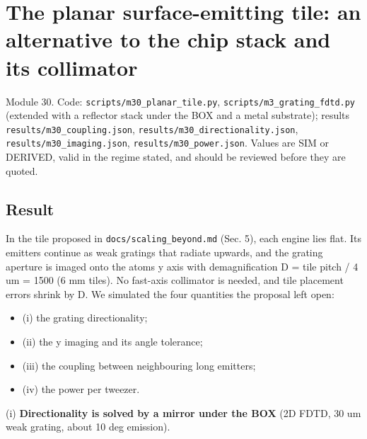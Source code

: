 \hypertarget{the-planar-surface-emitting-tile-an-alternative-to-the-chip-stack-and-its-collimator}{%
\chapter{The planar surface-emitting tile: an alternative to the chip
stack and its
collimator}\label{planar_tile-the-planar-surface-emitting-tile-an-alternative-to-the-chip-stack-and-its-collimator}}

Module 30. Code: \texttt{scripts/m30\_planar\_tile.py},
\texttt{scripts/m3\_grating\_fdtd.py} (extended with a reflector stack
under the BOX and a metal substrate); results
\texttt{results/m30\_coupling.json},
\texttt{results/m30\_directionality.json},
\texttt{results/m30\_imaging.json}, \texttt{results/m30\_power.json}.
Values are SIM or DERIVED, valid in the regime stated, and should be
reviewed before they are quoted.

\hypertarget{1-result}{%
\section{Result}\label{planar_tile-1-result}}

In the tile proposed in \texttt{docs/scaling\_beyond.md} (Sec. 5), each
engine lies flat. Its emitters continue as weak gratings that radiate
upwards, and the grating aperture is imaged onto the
atoms\textquotesingle{} y axis with demagnification D = tile pitch / 4
um = 1500 (6 mm tiles). No fast-axis collimator is needed, and tile
placement errors shrink by D. We simulated the four quantities the
proposal left open:

\begin{itemize}
\tightlist
\item
  (i) the grating directionality;
\item
  (ii) the y imaging and its angle tolerance;
\item
  (iii) the coupling between neighbouring long emitters;
\item
  (iv) the power per tweezer.
\end{itemize}

(i) \textbf{Directionality is solved by a mirror under the BOX} (2D
FDTD, 30 um weak grating, about 10 deg emission).

